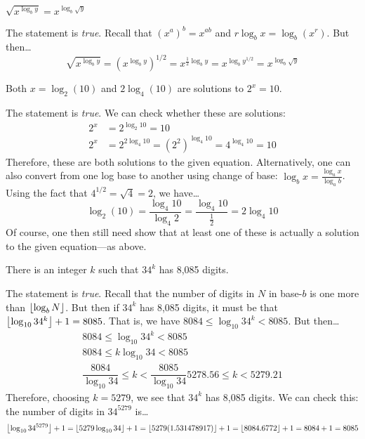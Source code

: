 \documentclass[11pt,letterpaper]{article}
\begin{document}
 $\sqrt{x^{\log_b y}}= x^{\log_b \sqrt{y}}$ \pspace

\sol The statement is \textit{true}. Recall that $(x^a)^b= x^{ab}$ and $r \log_b x= \log_b (x^r)$. But then\dots
	\[
	\sqrt{x^{\log_b y}}= (x^{\log_b y})^{1/2}= x^{\frac{1}{2} \log_b y}= x^{\log_b y^{1/2}}= x^{\log_b \sqrt{y}}
	\] \pvspace{1.3cm}



 Both $x= \log_2(10)$ and $2 \log_4(10)$ are solutions to $2^x= 10$. \pspace

\sol The statement is \textit{true}. We can check whether these are solutions:
	\[
	\begin{aligned}
	2^x&= 2^{\log_2 10}= 10 \\
	2^x&= 2^{2 \log_4 10}= (2^2)^{\log_4 10}= 4^{\log_4 10}= 10
	\end{aligned}
	\]
Therefore, these are both solutions to the given equation. Alternatively, one can also convert from one log base to another using change of base: $\log_b x= \frac{\log_a x}{\log_a b}$. Using the fact that $4^{1/2}= \sqrt{4}= 2$, we have\dots
	\[
	\log_2(10)= \dfrac{\log_4 10}{\log_4 2}= \dfrac{\log_4 10}{\frac{1}{2}}= 2 \log_4 10
	\]
Of course, one then still need show that at least one of these is actually a solution to the given equation---as above. \pvspace{1.3cm}



\newpage



 There is an integer $k$ such that $34^k$ has 8,085 digits. \pspace

\sol The statement is \textit{true}. Recall that the number of digits in $N$ in base-$b$ is one more than $\floor*{\log_b N}$. But then if $34^k$ has 8,085 digits, it must be that $\floor*{\log_{10} 34^k} + 1= 8085$. That is, we have $8084 \leq \log_{10} 34^k < 8085$. But then\dots
	\[
	\begin{gathered}
	8084 \leq \log_{10} 34^k < 8085 \\
	8084 \leq k \log_{10} 34 < 8085 \\
	\dfrac{8084}{\log_{10} 34} \leq k < \dfrac{8085}{\log_{10} 34}
	5278.56 \leq k < 5279.21
	\end{gathered}
	\]
Therefore, choosing $k= 5279$, we see that $34^k$ has 8,085 digits. We can check this: the number of digits in $34^{5279}$ is\dots
	\[
	\floor*{\log_{10} 34^{5279}} + 1= \floor*{5279 \log_{10} 34} + 1= \floor*{5279(1.531478917)} + 1= \floor*{8084.6772} + 1= 8084 + 1= 8085
	\] \pvspace{1.3cm}
\end{document}
